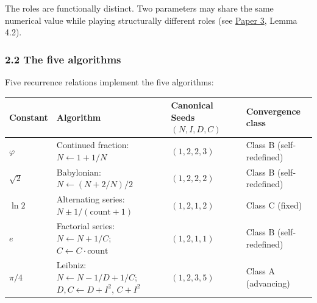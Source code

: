 \documentclass[
  11pt,
  letterpaper,
]{article}
\begin{document}
The roles are functionally distinct. Two parameters may share the same
numerical value while playing structurally different roles (see
\href{https://github.com/baardev/truevalue/blob/main/docnav/Research/papers/3_minimal-recursive-triadic-framework/3_minimal-recursive-triadic-framework.pdf}{Paper
3}, Lemma 4.2).

\subsubsection{2.2 The five algorithms}\label{the-five-algorithms}

Five recurrence relations implement the five algorithms:

\begin{longtable}[]{@{}
  >{\raggedright\arraybackslash}p{}
  >{\raggedright\arraybackslash}p{}
  >{\raggedright\arraybackslash}p{}
  >{\raggedright\arraybackslash}p{}@{}}
\toprule\noalign{}
\begin{minipage}[b]{\linewidth}\raggedright
Constant
\end{minipage} & \begin{minipage}[b]{\linewidth}\raggedright
Algorithm
\end{minipage} & \begin{minipage}[b]{\linewidth}\raggedright
Canonical Seeds \((N, I, D, C)\)
\end{minipage} & \begin{minipage}[b]{\linewidth}\raggedright
Convergence class
\end{minipage} \\
\midrule\noalign{}
\endhead
\bottomrule\noalign{}
\endlastfoot
\(\varphi\) & Continued fraction: \(N \leftarrow 1 + 1/N\) &
\((1, 2, 2, 3)\) & Class B (self-redefined) \\
\(\sqrt{2}\) & Babylonian: \(N \leftarrow (N + 2/N)/2\) &
\((1, 2, 2, 2)\) & Class B (self-redefined) \\
\(\ln 2\) & Alternating series: \(N \pm 1/(\text{count}+1)\) &
\((1, 2, 1, 2)\) & Class C (fixed) \\
\(e\) & Factorial series: \(N \leftarrow N + 1/C\);
\(C \leftarrow C \cdot \text{count}\) & \((1, 2, 1, 1)\) & Class B
(self-redefined) \\
\(\pi/4\) & Leibniz: \(N \leftarrow N - 1/D + 1/C\);
\(D, C \leftarrow D + I^2\), \(C + I^2\) & \((1, 2, 3, 5)\) & Class A
(advancing) \\
\end{longtable}
\end{document}
